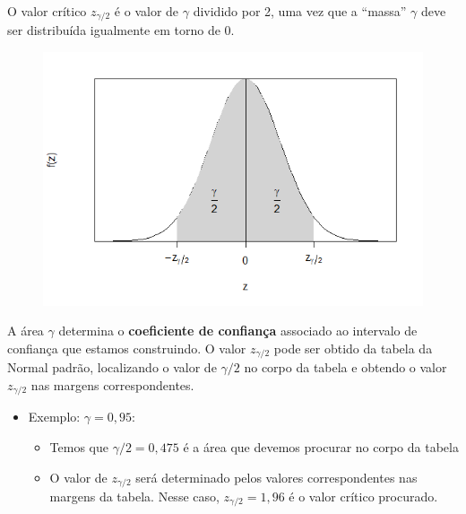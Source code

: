 \documentclass[14pt,aspectratio=1610]{beamer}
\begin{document}
\begin{frame}{}
    \begin{block}{}
    \justifying
O valor crítico $z_{\gamma/2}$ é o valor de $\gamma$ dividido por 2, uma vez que a ``massa'' $\gamma$ deve ser distribuída igualmente em torno de 0.    
    \end{block}
    
\begin{figure}
    \centering
    \includegraphics[scale=0.8]{figs/IC2.png}
\end{figure}
\end{frame}

\begin{frame}{}
    \begin{block}{}
    \justifying
A área $\gamma$ determina o \textbf{coeficiente de confiança} associado ao intervalo de confiança que estamos construindo. O valor $z_{\gamma/2}$ pode ser obtido da tabela da Normal padrão, localizando o valor de $\gamma/2$ no corpo da tabela e obtendo o valor $z_{\gamma/2}$ nas margens correspondentes. 
\begin{itemize}
    \item Exemplo: $\gamma = 0,95$:
    \begin{itemize}
    \item Temos que $\gamma/2 = 0,475$ é a área que devemos procurar no corpo da tabela

    \item O valor de $z_{\gamma/2}$ será determinado pelos valores correspondentes nas margens da tabela. Nesse caso, $z_{\gamma/2} = 1,96$ é o valor crítico procurado.   
\end{itemize}
\end{itemize}

    \end{block}
\end{frame}
\end{document}
